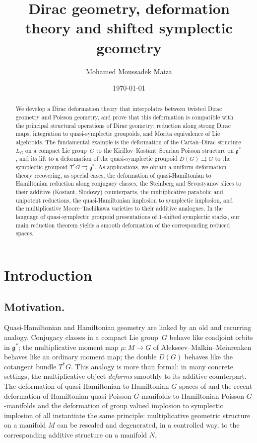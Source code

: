 \documentclass[reqno]{amsart}
\title{Dirac geometry, deformation theory and shifted symplectic geometry}
\date{\today}
\author{Mohamed Moussadek Maiza}
\theoremstyle{plain}
\theoremstyle{definition}
\begin{document}
\maketitle

\begin{abstract}
We develop a Dirac deformation theory that interpolates between twisted Dirac geometry and Poisson geometry, and prove that this deformation is compatible with the principal structural operations of Dirac geometry: reduction along strong Dirac maps, integration to quasi-symplectic groupoids, and Morita equivalence of Lie algebroids.
The fundamental example is the deformation of the Cartan--Dirac structure $L_G$ on a compact Lie group~$G$
to the Kirillov--Kostant--Souriau Poisson structure on $\mathfrak{g}^*$, and its lift to a deformation
of the quasi-symplectic groupoid $D(G)\rightrightarrows G$ to the symplectic groupoid $T^*G\rightrightarrows\mathfrak{g}^*$.
As applications, we obtain a uniform deformation theory recovering, as special cases, the deformation of quasi-Hamiltonian to Hamiltonian reduction along conjugacy classes, the Steinberg and Sevostyanov slices to their additive (Kostant, Slodowy) counterparts, the multiplicative parabolic and unipotent reductions, the quasi-Hamiltonian implosion to symplectic implosion, and the
multiplicative Moore--Tachikawa varieties to their additive analogues. In the language of quasi-symplectic groupoid presentations of $1$-shifted symplectic stacks, our main reduction theorem yields a smooth deformation of the corresponding reduced spaces.
\end{abstract}

\section{Introduction}
\subsection*{Motivation.}
Quasi-Hamiltonian and Hamiltonian geometry are linked by an old and recurring analogy.
Conjugacy classes in a compact Lie group~$G$ behave like coadjoint orbits in $\mathfrak{g}^*$;
the multiplicative moment map $\mu\colon M\to G$ of Alekseev--Malkin--Meinrenken behaves
like an ordinary moment map; the double $D(G)$ behaves like the cotangent bundle $T^*G$.
This analogy is more than formal: in many concrete settings, the multiplicative object
\emph{deforms} smoothly to its additive counterpart. The deformation of quasi-Hamiltonian to Hamiltonian $G$-spaces of \cite{burelle2026deformations} and the recent deformation of Hamiltonian quasi-Poisson $G$-manifolds to Hamiltonian Poisson $G$-manifolds and the deformation of group valued implosion to symplectic implosion of \cite{maiza2026multiplicative} all instantiate the same principle: multiplicative geometric structure on a manifold $M$ can be rescaled and degenerated, in a controlled way, to the corresponding additive structure on a manifold $N$.\\  
\end{document}
